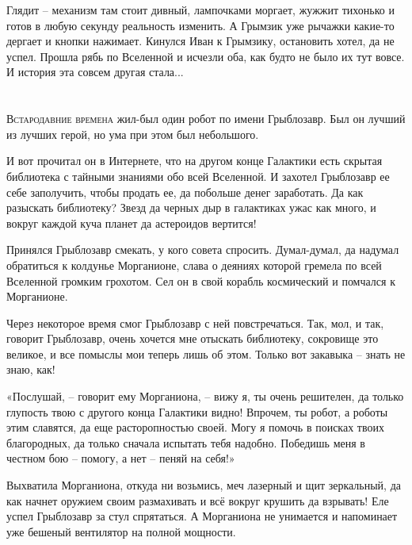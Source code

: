 \documentclass[ebook,oneside,final,openright]{memoir}
\begin{document}
\par
Глядит – механизм там стоит дивный, лампочками моргает, жужжит тихонько и готов в любую секунду реальность изменить. А Грымзик уже рычажки какие-то дергает и кнопки нажимает. Кинулся Иван к Грымзику, остановить хотел, да не успел. Прошла рябь по Вселенной и исчезли оба, как будто не было их тут вовсе. И история эта совсем другая стала...\par

\chapter{}
 \lettrine{В}{стародавние времена} жил-был один робот по имени Грыблозавр. Был он лучший из лучших герой, но ума при этом был небольшого.\par
\par
И вот прочитал он в Интернете, что на другом конце Галактики есть скрытая библиотека с тайными знаниями обо всей Вселенной. И захотел Грыблозавр ее себе заполучить, чтобы продать ее, да побольше денег заработать. Да как разыскать библиотеку? Звезд да черных дыр в галактиках ужас как много, и вокруг каждой куча планет да астероидов вертится!\par
\par
Принялся Грыблозавр смекать, у кого совета спросить. Думал-думал, да надумал обратиться к колдунье Морганионе, слава о деяниях которой гремела по всей Вселенной громким грохотом. Сел он в свой корабль космический и помчался к Морганионе.\par
\par
Через некоторое время смог Грыблозавр с ней повстречаться. Так, мол, и так, говорит Грыблозавр, очень хочется мне отыскать библиотеку, сокровище это великое, и все помыслы мои теперь лишь об этом. Только вот закавыка – знать не знаю, как!\par
\par
«Послушай, – говорит ему Морганиона, – вижу я, ты очень решителен, да только глупость твою с другого конца Галактики видно! Впрочем, ты робот, а роботы этим славятся, да еще расторопностью своей. Могу я помочь в поисках твоих благородных, да только сначала испытать тебя надобно. Победишь меня в честном бою – помогу, а нет – пеняй на себя!» \par
\par
Выхватила Морганиона, откуда ни возьмись, меч лазерный и щит зеркальный, да как начнет оружием своим размахивать и всё вокруг крушить да взрывать! Еле успел Грыблозавр за стул спрятаться. А Морганиона не унимается и напоминает уже бешеный вентилятор на полной мощности. \par
\end{document}
